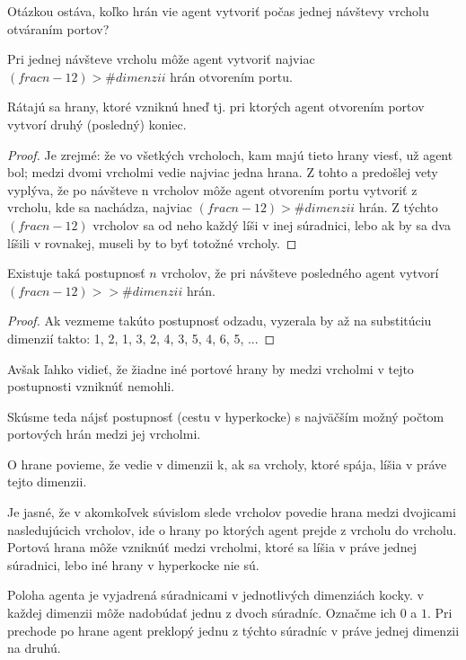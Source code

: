 Otázkou ostáva, koľko hrán vie agent vytvoriť počas jednej návštevy vrcholu
otváraním portov? 
\begin{lem}
Pri jednej návšteve vrcholu môže agent vytvoriť najviac $(frac{n-1}{2}) > \#dimenzii$
hrán otvorením portu.
\end{lem}
\begin{pozn}
Rátajú sa hrany, ktoré vzniknú hneď tj. pri ktorých agent otvorením portov
vytvorí druhý (posledný) koniec.
\end{pozn}
\begin{proof}
Je zrejmé: že vo všetkých vrcholoch, kam majú tieto hrany
viesť, už agent bol; medzi dvomi vrcholmi vedie najviac jedna hrana. Z tohto
a predošlej vety vyplýva, že po návšteve n vrcholov môže agent otvorením
portu vytvoriť z vrcholu, kde sa nachádza, najviac $(frac{n-1}{2}) > \#dimenzii$ hrán. Z
týchto $(frac{n-1}{2})$ vrcholov sa od neho každý líši v inej súradnici,
lebo ak by sa dva líšili v rovnakej, museli by to byť totožné vrcholy. 
\end{proof}
\begin{lem}
Existuje taká postupnosť $n$ vrcholov, že pri návšteve posledného agent
vytvorí $(frac{n-1}{2}) > >\#dimenzii$ hrán.
\end{lem}
\begin{proof}
Ak vezmeme takúto postupnosť odzadu, vyzerala by až na substitúciu dimenzií
takto: 1, 2, 1, 3, 2, 4, 3, 5, 4, 6, 5, ...
\end{proof}
\begin{pozn}
Avšak ľahko vidieť, že žiadne iné portové hrany by medzi vrcholmi v tejto
postupnosti vzniknúť nemohli.
\end{pozn}
Skúsme teda nájsť postupnosť (cestu v hyperkocke) s najväčším možný počtom 
portových hrán medzi jej vrcholmi.
\begin{ozn}
O hrane povieme, že vedie v dimenzii k, ak sa vrcholy, ktoré spája, líšia v
práve tejto dimenzii. 
\end{ozn}
Je jasné, že v akomkoľvek súvislom slede vrcholov povedie hrana
medzi dvojicami nasledujúcich vrcholov, ide o hrany po ktorých agent prejde
z vrcholu do vrcholu.
Portová hrana môže vzniknúť medzi vrcholmi, ktoré sa líšia v práve jednej
súradnici, lebo iné hrany v hyperkocke nie sú. 
\begin{ozn}
Poloha agenta je vyjadrená súradnicami v jednotlivých dimenziách kocky. v
každej dimenzii môže nadobúdať jednu z dvoch súradníc. Označme ich $0$ a $1$.
Pri prechode po hrane agent preklopý jednu z týchto súradníc v práve jednej
dimenzii na druhú.
\end{ozn}

